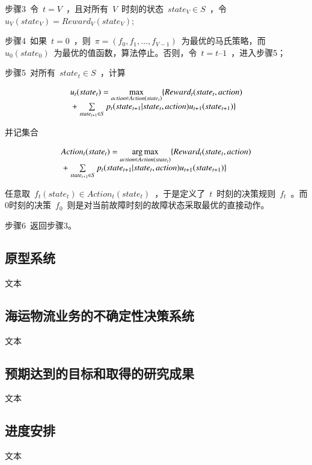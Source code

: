 步骤3~令~$t=V$~，且对所有~$V$~时刻的状态~$state_V \in S$~，令~${u_V}( {state_V} ) = Reward_V( {state_V} )$;

步骤4~如果~$t=0$~，则~$\pi  = (f_0,f_1,\ldots ,f_{V-1})$~为最优的马氏策略，而~${u_0}( state_0)$~为最优的值函数，算法停止。否则，令~$t=t–1$~，进入步骤5；

步骤5~对所有~$state_t \in S$~，计算

\begin{equation}\label{backward_mdp}
\begin{array}{l}
{u_t}(stat{e_t}) = \mathop {\max }\limits_{action \in Action(stat{e_t})} \{ Rewar{d_t}(stat{e_t},action)\\
{\rm{                        }} + \sum\limits_{stat{e_{t + 1}} \in S} {{p_t}(stat{e_{t + 1}}|stat{e_t},action){u_{t + 1}}(stat{e_{t + 1}})} \} 
\end{array}
\end{equation}

并记集合

\begin{equation}\label{backward_mdp_arg}
\begin{array}{l}
Actio{n_t}(stat{e_t}) = \mathop {\arg \max }\limits_{action \in Action(stat{e_t})} \{ Rewar{d_t}(stat{e_t},action)\\
{\rm{                       }} + \sum\limits_{stat{e_{t + 1}} \in S} {{p_t}(stat{e_{t + 1}}|stat{e_t},action){u_{t + 1}}(stat{e_{t + 1}})} \} 
\end{array}
\end{equation}

任意取~$f_t(state_t) \in Action_t(state_t)$~，于是定义了~$t$~时刻的决策规则~$f_t$~。而0时刻的决策~$f_0$~则是对当前故障时刻的故障状态采取最优的直接动作。

步骤6~返回步骤3。

\subsection{原型系统}
文本

\subsection{海运物流业务的不确定性决策系统}
文本


\subsection{预期达到的目标和取得的研究成果}
文本

\subsection{进度安排}
文本
